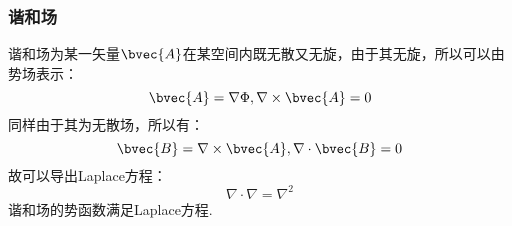 \subsubsection{谐和场}
谐和场为某一矢量$\bvec{A}$在某空间内既无散又无旋，由于其无旋，所以可以由势场表示：
\begin{equation}\label{VecAnl_eq28}
\bvec{A}=\nabla\Phi,\nabla\times\bvec{A}=0
\end{equation}
同样由于其为无散场，所以有：
\begin{equation}\label{VecAnl_eq29}
\bvec{B}=\nabla\times\bvec{A} ,\nabla\cdot\bvec{B}=0
\end{equation}
故可以导出Laplace方程：
\begin{equation}\label{VecAnl_eq30}
\nabla\cdot\nabla=\nabla^2
\end{equation}
谐和场的势函数满足Laplace方程.
